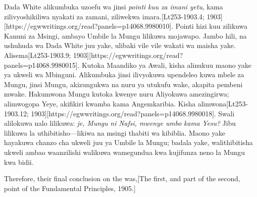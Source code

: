 Dada White alikumbuka uzoefu wa jinsi \textit{pointi kuu za imani yetu}, kama zilivyoshikiliwa nyakati za zamani, ziliwekwa imara.[Lt253-1903.4; 1903][https://egwwritings.org/read?panels=p14068.9980010]. Pointi hizi kuu zilikuwa Kanuni za Msingi, ambayo Umbile la Mungu lilikuwa mojawapo. Jambo hili, na ushuhuda wa Dada White juu yake, ulibaki vile vile wakati wa maisha yake. Alisema[Lt253-1903.9; 1903][https://egwwritings.org/read?panels=p14068.9980015]. Kutoka Maandiko ya Awali, kisha alinukuu maono yake ya ukweli wa Mbinguni. Alikumbuka jinsi ilivyokuwa upendeleo kuwa mbele za Mungu, jinsi Mungu, akizungukwa na nuru ya utukufu wake, akapita pembeni mwake. Hakumwona Mungu kutoka kwenye nuru Aliyokuwa amezingirwa; alimwogopa Yeye, akifikiri kwamba kama Angemkaribia. Kisha alimwona[Lt253-1903.12; 1903][https://egwwritings.org/read?panels=p14068.9980018]. Swali alilokuwa nalo lilikuwa: \textit{je, Mungu ni Nafsi, mwenye umbo kama Yesu?} Jibu lilikuwa la uthibitisho—likiwa na msingi thabiti wa kibiblia. Maono yake hayakuwa chanzo cha ukweli juu ya Umbile la Mungu; badala yake, walithibitisha ukweli ambao waanzilishi walikuwa wamegundua kwa kujifunza neno la Mungu kwa bidii.


Therefore, their final conclusion on the  was,[The first, and part of the second, point of the Fundamental Principles, 1905.]


